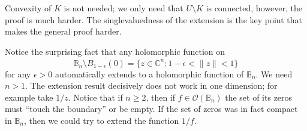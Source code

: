 \documentclass[12pt,openany]{book}
\newcommand{\snorm}[1]{\lVert {#1} \rVert}
\newcommand{\C}{{\mathbb{C}}}
\newcommand{\bB}{{\mathbb{B}}}
\newcommand{\sO}{{\mathcal{O}}}
\theoremstyle{plain}
\theoremstyle{remark}
\theoremstyle{definition}
\theoremstyle{exercise}
\theoremstyle{example}
\begin{document}
Convexity of $K$ is not needed; we only need that $U\setminus K$
is connected, however, the proof is much harder.
The singlevaluedness of the extension is the key point that makes the
general proof harder.

Notice the surprising fact that any holomorphic function on
\begin{equation*}
\bB_n \setminus \overline{B_{1-\epsilon}(0)} = \{ z \in \C^n : 1-\epsilon <
\snorm{z} < 1 \}
\end{equation*}
for any $\epsilon > 0$ automatically
extends to a holomorphic function of $\bB_n$.  We need $n > 1$.
The extension result decisively does not work in one dimension; for
example take $1/z$.  Notice that if $n \geq 2$, then if $f \in \sO(\bB_n)$
the set of its zeros must 
``touch the boundary'' or be empty.  If the set of zeros was in fact
compact in $\bB_n$, then we could try to
extend the function $1/f$.
\end{document}
